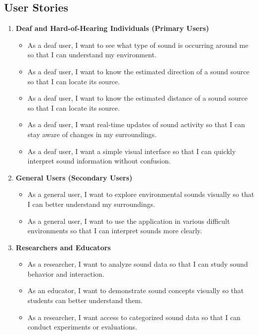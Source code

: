 \subsection{User Stories}
\begin{enumerate}[leftmargin=80pt]

\item \textbf{Deaf and Hard-of-Hearing Individuals (Primary Users)}
\begin{itemize}
    \item As a deaf user, I want to see what type of sound is occurring around me so that I can understand my environment.
    \item As a deaf user, I want to know the estimated direction of a sound source so that I can locate its source.
    \item As a deaf user, I want to know the estimated distance of a sound source so that I can locate its source.
    \item As a deaf user, I want real-time updates of sound activity so that I can stay aware of changes in my surroundings.
    \item As a deaf user, I want a simple visual interface so that I can quickly interpret sound information without confusion.
\end{itemize}

\item \textbf{General Users (Secondary Users)}
\begin{itemize}
    \item As a general user, I want to explore environmental sounds visually so that I can better understand my surroundings.
    \item As a general user, I want to use the application in various difficult environments so that I can interpret sounds more clearly.
\end{itemize}

\item \textbf{Researchers and Educators}
\begin{itemize}
    \item As a researcher, I want to analyze sound data so that I can study sound behavior and interaction.
    \item As an educator, I want to demonstrate sound concepts visually so that students can better understand them.
    \item As a researcher, I want access to categorized sound data so that I can conduct experiments or evaluations.
\end{itemize}


\end{enumerate}

